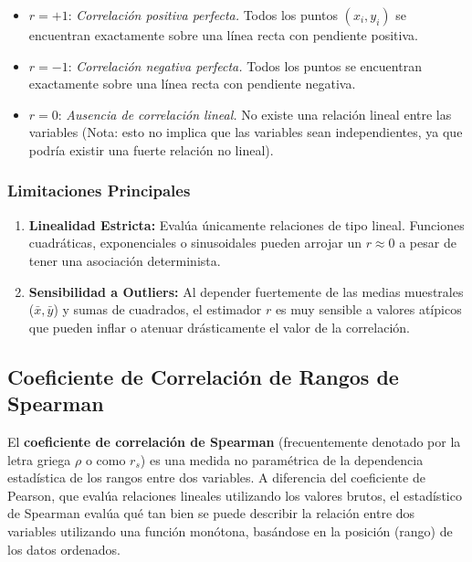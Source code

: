 \documentclass[12pt]{article}
\begin{document}
\begin{itemize}
    \item \textbf{$r = +1$}: \textit{Correlación positiva perfecta.} Todos los puntos $(x_i, y_i)$ se encuentran exactamente sobre una línea recta con pendiente positiva.
    \item \textbf{$r = -1$}: \textit{Correlación negativa perfecta.} Todos los puntos se encuentran exactamente sobre una línea recta con pendiente negativa.
    \item \textbf{$r = 0$}: \textit{Ausencia de correlación lineal.} No existe una relación lineal entre las variables (Nota: esto no implica que las variables sean independientes, ya que podría existir una fuerte relación no lineal).
\end{itemize}

\subsubsection*{Limitaciones Principales}

\begin{enumerate}
    \item \textbf{Linealidad Estricta:} Evalúa únicamente relaciones de tipo lineal. Funciones cuadráticas, exponenciales o sinusoidales pueden arrojar un $r \approx 0$ a pesar de tener una asociación determinista.
    \item \textbf{Sensibilidad a Outliers:} Al depender fuertemente de las medias muestrales ($\bar{x}, \bar{y}$) y sumas de cuadrados, el estimador $r$ es muy sensible a valores atípicos que pueden inflar o atenuar drásticamente el valor de la correlación.
\end{enumerate}

\subsection*{Coeficiente de Correlación de Rangos de Spearman}

El \textbf{coeficiente de correlación de Spearman} (frecuentemente denotado por la letra griega $\rho$ o como $r_s$) es una medida no paramétrica de la dependencia estadística de los rangos entre dos variables. A diferencia del coeficiente de Pearson, que evalúa relaciones lineales utilizando los valores brutos, el estadístico de Spearman evalúa qué tan bien se puede describir la relación entre dos variables utilizando una función monótona, basándose en la posición (rango) de los datos ordenados.\cite{ref2}\\
\end{document}
